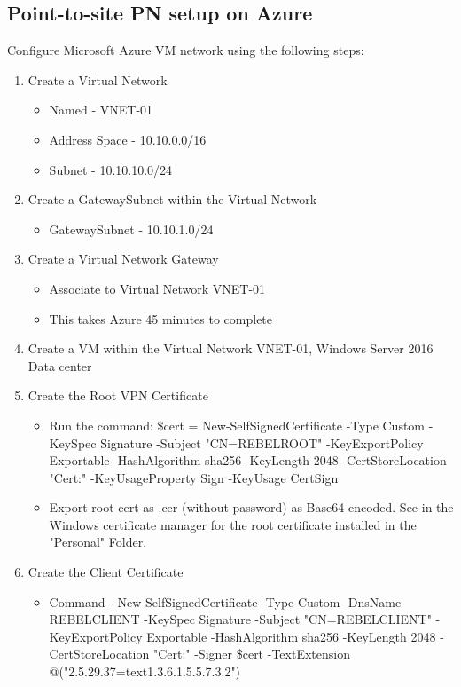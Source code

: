 \documentclass{article}
\begin{document}
\subsection{Point-to-site PN setup on Azure}

Configure Microsoft Azure VM network using the following steps:
\begin{enumerate}
\item Create a Virtual Network
\begin{itemize}
\item Named - VNET-01
\item Address Space - 10.10.0.0/16
\item Subnet - 10.10.10.0/24
\end{itemize}
\item Create a GatewaySubnet within the Virtual Network
\begin{itemize}
\item GatewaySubnet - 10.10.1.0/24
\end{itemize}
\item Create a Virtual Network Gateway
\begin{itemize}
\item Associate to Virtual Network VNET-01
\item This takes Azure 45 minutes to complete
\end{itemize}
\item Create a VM within the Virtual Network VNET-01, Windows Server 2016 Data center
\item Create the Root VPN Certificate
\begin{itemize}
\item Run the command: \$cert = New-SelfSignedCertificate -Type Custom -KeySpec Signature -Subject "CN=REBELROOT" -KeyExportPolicy Exportable -HashAlgorithm sha256 -KeyLength 2048 -CertStoreLocation "Cert:\CurrentUser\My" -KeyUsageProperty Sign -KeyUsage CertSign
\item Export root cert as .cer (without password) as Base64 encoded. See in the Windows certificate manager for the root certificate installed in the "Personal" Folder.
\end{itemize}
\item Create the Client Certificate
\begin{itemize}
\item Command - New-SelfSignedCertificate -Type Custom -DnsName REBELCLIENT -KeySpec Signature -Subject "CN=REBELCLIENT" -KeyExportPolicy Exportable -HashAlgorithm sha256 -KeyLength 2048 -CertStoreLocation "Cert:\CurrentUser\My" -Signer \$cert -TextExtension @("2.5.29.37={text}1.3.6.1.5.5.7.3.2")

\end{itemize}
\end{enumerate}
\end{document}

